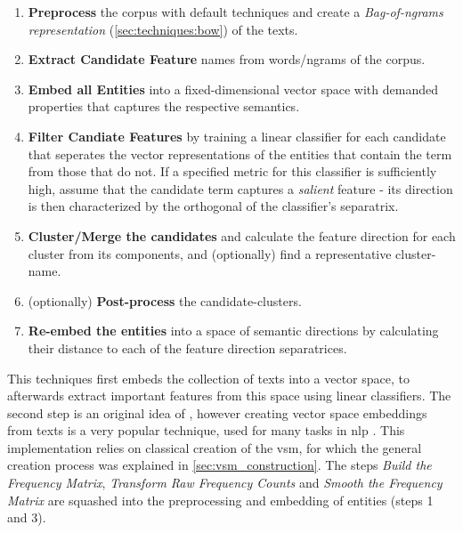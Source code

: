 \label{sec:algorithmsteps}
\begin{enumerate}
	\item[\saveref{sec:algo_preproc}{1.}] \textbf{Preprocess} the corpus with default techniques and create a \textit{Bag-of-ngrams representation} (\ref{sec:techniques:bow}) of the texts.
	\item[\saveref{sec:extract_cands}{2.}] \textbf{Extract Candidate Feature} names from words/\glspl{ngram} of the corpus.
	\item[\saveref{sec:generate_vectorspaces}{3.}] \textbf{Embed all Entities} into a fixed-dimensional vector space with demanded properties that captures the respective semantics.
	\item[\saveref{sec:svm_filter_cands}{4.}] \textbf{Filter Candiate Features} by training a linear classifier for each candidate that seperates the vector representations of the entities that contain the term from those that do not. If a specified metric for this classifier is sufficiently high, assume that the candidate term captures a \textit{salient} feature - its direction is then characterized by the orthogonal of the classifier's separatrix.
	\item[\saveref{sec:algo:cluster}{5.}] \textbf{Cluster/Merge the candidates} and calculate the feature direction for each cluster from its components, and (optionally) find a representative cluster-name.
	\item[\saveref{sec:algo:postprocess}{6.}] (optionally) \textbf{Post-process} the candidate-clusters.
	\item[\saveref{sec:algo:reembed}{7.}] \textbf{Re-embed the entities} into a space of semantic directions by calculating their distance to each of the feature direction separatrices.	
\end{enumerate}

This techniques first embeds the collection of texts into a  vector space, to afterwards extract important features from this space using linear classifiers. The second step is an original idea of \cite{Derrac2015}, however creating vector space embeddings from texts is a very popular technique, used for many tasks in \gls{nlp} \cite{Mikolov:Regularities,Mikolov2013a,Guo,Lowe,Turney2010}. This implementation relies on classical creation of the \gls{vsm}, for which the general creation process was explained in \autoref{sec:vsm_construction}. The steps \textit{Build the Frequency Matrix}, \textit{Transform Raw Frequency Counts} and \textit{Smooth the Frequency Matrix} are squashed into the preprocessing and embedding of entities (steps 1 and 3).

